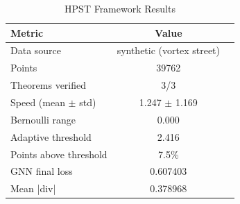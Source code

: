 \begin{table}[h]
\centering
\caption{HPST Framework Results}
\begin{tabular}{lcc}
\hline
Metric & Value \\
\hline
Data source & synthetic (vortex street) \\
Points & 39762 \\
Theorems verified & 3/3 \\
Speed (mean $\pm$ std) & 1.247 $\pm$ 1.169 \\
Bernoulli range & 0.000 \\
Adaptive threshold & 2.416 \\
Points above threshold & 7.5\% \\
GNN final loss & 0.607403 \\
Mean |div| & 0.378968 \\
\hline
\end{tabular}
\end{table}
